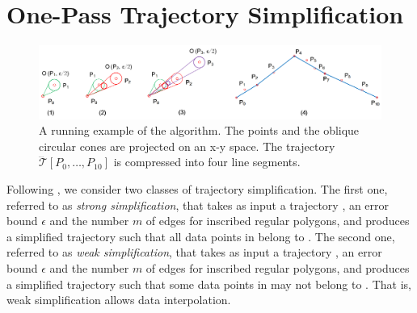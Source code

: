 \section{One-Pass Trajectory Simplification}
\label{sec-alg}


\begin{figure}[tb!]
	\centering
	\includegraphics[scale=0.8]{figures/Fig-Ex-Conest.png}
	\caption{\small A running example of the \cist algorithm. The points and the oblique circular cones are projected on an x-y space. The trajectory $\dddot{\mathcal{T}}[P_0, \ldots, P_{10}]$ is compressed into four line segments.}
	\label{fig:exm-const}
\end{figure}


Following \cite{Trajcevski:DDR,Lin:Operb}, we consider two classes of trajectory simplification.
The first one, referred to as \emph{strong simplification}, that takes as input a trajectory , an error bound $\epsilon$ and the number $m$ of edges for inscribed regular polygons, and produces a simplified trajectory  such that all data points in  belong to .
The second one, referred to as \emph{weak simplification}, that takes as input a trajectory , an error bound $\epsilon$ and the number $m$ of edges for inscribed regular polygons, and produces a simplified trajectory  such that some data points in  may not belong to . That is, weak simplification allows data interpolation.



